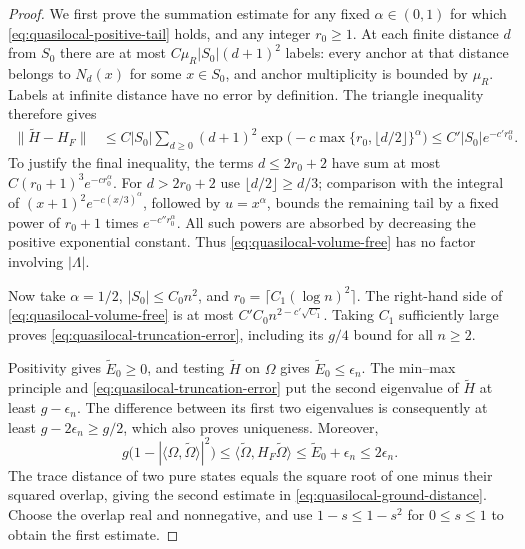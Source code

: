 \begin{proof}
We first prove the summation estimate for any fixed $\alpha\in(0,1)$
for which \eqref{eq:quasilocal-positive-tail} holds, and any integer
$r_0\ge1$.  At each finite distance $d$ from
$S_0$ there are at most $C\mu_R|S_0|(d+1)^2$ labels: every anchor at that
distance belongs to $N_d(x)$ for some $x\in S_0$, and anchor multiplicity
is bounded by $\mu_R$.  Labels at infinite distance have no error by
definition.  The triangle inequality therefore gives
\begin{align}
 \|\widetilde H-H_F\|
 &\le C|S_0|\sum_{d\ge0}(d+1)^2
       \exp\bigl(-c\max\{r_0,\lfloor d/2\rfloor\}^{\alpha}\bigr)
   \le C'|S_0|e^{-c'r_0^\alpha}.
 \label{eq:quasilocal-volume-free}
\end{align}
To justify the final inequality, the terms $d\le2r_0+2$ have sum at
most $C(r_0+1)^3e^{-cr_0^\alpha}$.  For $d>2r_0+2$ use
$\lfloor d/2\rfloor\ge d/3$; comparison with the integral of
$(x+1)^2e^{-c(x/3)^\alpha}$, followed by $u=x^\alpha$, bounds the
remaining tail by a fixed power of $r_0+1$ times $e^{-c''r_0^\alpha}$.
All such powers are absorbed by decreasing the positive exponential
constant.  Thus \eqref{eq:quasilocal-volume-free} has no factor involving
$|\Lambda|$.

Now take $\alpha=1/2$, $|S_0|\le C_0n^2$, and
$r_0=\lceil C_1(\log n)^2\rceil$.  The right-hand side of
\eqref{eq:quasilocal-volume-free} is at most
$C'C_0n^{2-c'\sqrt{C_1}}$.  Taking $C_1$ sufficiently large proves
\eqref{eq:quasilocal-truncation-error}, including its $g/4$ bound for
all $n\ge2$.

Positivity gives $\widetilde E_0\ge0$, and testing
$\widetilde H$ on $\Omega$ gives $\widetilde E_0\le\epsilon_n$.
The min--max principle and \eqref{eq:quasilocal-truncation-error} put
the second eigenvalue of $\widetilde H$ at least $g-\epsilon_n$.
The difference between its first two eigenvalues is consequently at least
$g-2\epsilon_n\ge g/2$, which also proves uniqueness.  Moreover,
\[
 g\bigl(1-|\langle\Omega,\widetilde\Omega\rangle|^2\bigr)
 \le\langle\widetilde\Omega,H_F\widetilde\Omega\rangle
 \le\widetilde E_0+\epsilon_n\le2\epsilon_n.
\]
The trace distance of two pure states equals the square root of one minus
their squared overlap, giving the second estimate in
\eqref{eq:quasilocal-ground-distance}.  Choose the overlap real and
nonnegative, and use $1-s\le1-s^2$ for $0\le s\le1$ to obtain the
first estimate.


\end{proof}
